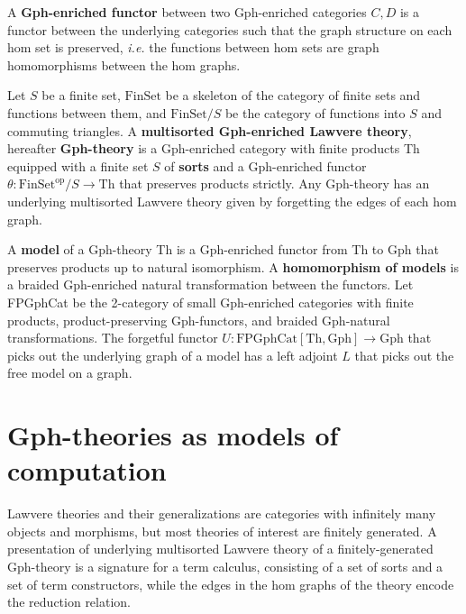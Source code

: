 \documentclass{llncs}
\newcommand{\maps}{\colon}
\newcommand{\Th}{\mathrm{Th}}
\newcommand{\Gph}{\mathrm{Gph}}
\newcommand{\FinSet}{\mathrm{FinSet}}
\newcommand{\FPGphCat}{\mathrm{FPGphCat}}
\newcommand{\op}{\mathrm{op}}
\begin{document}
A {\bf Gph-enriched functor} between two Gph-enriched categories $C, D$ is a functor between the underlying categories such that the graph structure on each hom set is preserved, {\em i.e.} the functions between hom sets are graph homomorphisms between the hom graphs.

Let $S$ be a finite set, $\FinSet$ be a skeleton of the category of finite sets and functions between them, and $\FinSet/S$ be the category of functions into $S$ and commuting triangles.  A {\bf multisorted Gph-enriched Lawvere theory}, hereafter {\bf Gph-theory} is a Gph-enriched category with finite products Th equipped with a finite set $S$ of {\bf sorts} and a Gph-enriched functor $\theta\maps \FinSet^{\op}/S \to \Th$ that preserves products strictly.  Any Gph-theory has an underlying multisorted Lawvere theory given by forgetting the edges of each hom graph.

A {\bf model} of a Gph-theory Th is a Gph-enriched functor from Th to Gph that preserves products up to natural isomorphism.  A {\bf homomorphism of models} is a braided Gph-enriched natural transformation between the functors.  Let FPGphCat be the 2-category of small Gph-enriched categories with finite products, product-preserving Gph-functors, and braided Gph-natural transformations.  The forgetful functor $U\maps \FPGphCat[\Th, \Gph] \to \Gph$ that picks out the underlying graph of a model has a left adjoint $L$ that picks out the free model on a graph.

\section{Gph-theories as models of computation}

Lawvere theories and their generalizations are categories with infinitely many objects and morphisms, but most theories of interest are finitely generated.  A presentation of underlying multisorted Lawvere theory of a finitely-generated Gph-theory is a signature for a term calculus, consisting of a set of sorts and a set of term constructors, while the edges in the hom graphs of the theory encode the reduction relation.
\end{document}
